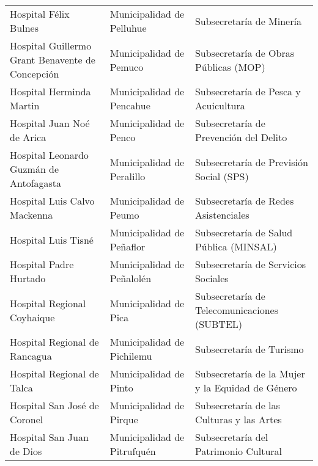 \documentclass[11pt]{article}
\begin{document}
\begin{longtable}{ p{5cm} | p{5cm} | p{5cm} }
                             Hospital Félix Bulnes &                          Municipalidad de Pelluhue &                           Subsecretaría de Minería \\
  Hospital Guillermo Grant Benavente de Concepción &                            Municipalidad de Pemuco &              Subsecretaría de Obras Públicas (MOP) \\
                          Hospital Herminda Martin &                          Municipalidad de Pencahue &               Subsecretaría de Pesca y Acuicultura \\
                        Hospital Juan Noé de Arica &                             Municipalidad de Penco &             Subsecretaría de Prevención del Delito \\
           Hospital Leonardo Guzmán de Antofagasta &                         Municipalidad de Peralillo &            Subsecretaría de Previsión Social (SPS) \\
                      Hospital Luis Calvo Mackenna &                             Municipalidad de Peumo &               Subsecretaría de Redes Asistenciales \\
                               Hospital Luis Tisné &                          Municipalidad de Peñaflor &            Subsecretaría de Salud Pública (MINSAL) \\
                            Hospital Padre Hurtado &                         Municipalidad de Peñalolén &                Subsecretaría de Servicios Sociales \\
                       Hospital Regional Coyhaique &                              Municipalidad de Pica &       Subsecretaría de Telecomunicaciones (SUBTEL) \\
                     Hospital Regional de Rancagua &                         Municipalidad de Pichilemu &                           Subsecretaría de Turismo \\
                        Hospital Regional de Talca &                             Municipalidad de Pinto &   Subsecretaría de la Mujer y la Equidad de Género \\
                      Hospital San José de Coronel &                            Municipalidad de Pirque &          Subsecretaría de las Culturas y las Artes \\
                         Hospital San Juan de Dios &                        Municipalidad de Pitrufquén &              Subsecretaría del Patrimonio Cultural \\

\end{longtable}
\end{document}
